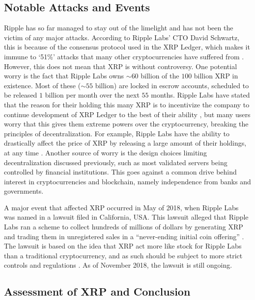 \documentclass[11pt,a4paper]{article}
\begin{document}
	\subsection{Notable Attacks and Events}
	
	Ripple has so far managed to stay out of the limelight and has not been the victim of any major attacks. According to Ripple Labs' CTO David Schwartz, this is because of the consensus protocol used in the XRP Ledger, which makes it immune to `51\%' attacks that many other cryptocurrencies have suffered from \cite{newsbtc}. However, this does not mean that XRP is without controversy. One potential worry is the fact that Ripple Labs owns $\sim60$ billion of the $100$ billion XRP in existence. Most of these ($\sim55$ billion) are locked in escrow accounts, scheduled to be released $1$ billion per month over the next $55$ months. Ripple Labs have stated that the reason for their holding this many XRP is to incentivize the company to continue development of XRP Ledger to the best of their ability \cite{technicalFAQ}, but many users worry that this gives them extreme powers over the cryptocurrency, breaking the principles of decentralization. For example, Ripple Labs have the ability to drastically affect the price of XRP by releasing a large amount of their holdings, at any time \cite{investinblockchain}. Another source of worry is the design choices limiting decentralization discussed previously, such as most validated servers being controlled by financial institutions. This goes against a common drive behind interest in cryptocurrencies and blockchain, namely independence from banks and governments.
	
	A major event that affected XRP occurred in May of 2018, when Ripple Labs was named in a lawsuit filed in California, USA. This lawsuit alleged that Ripple Labs ran a scheme to collect hundreds of millions of dollars by generating XRP and trading them in unregistered sales in a ``never-ending initial coin offering'' \cite{bloomberg}. The lawsuit is based on the idea that XRP act more like stock for Ripple Labs than a traditional cryptocurrency, and as such should be subject to more strict controls and regulations \cite{blockexplorer}. As of November 2018, the lawsuit is still ongoing.
	
	\subsection{Assessment of XRP and Conclusion}
	
\end{document}
